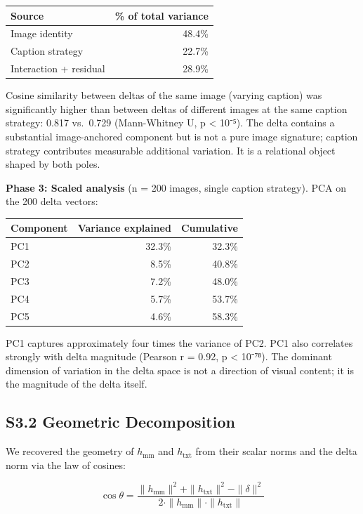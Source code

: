 \documentclass[11pt,a4paper]{article}
\begin{document}
\begin{longtable}[]{@{}lr@{}}
\toprule\noalign{}
Source & \% of total variance \\
\midrule\noalign{}
\endhead
\bottomrule\noalign{}
\endlastfoot
Image identity & 48.4\% \\
Caption strategy & 22.7\% \\
Interaction + residual & 28.9\% \\
\end{longtable}

Cosine similarity between deltas of the same image (varying caption) was significantly higher than between deltas of different images at the same caption strategy: 0.817 vs.~0.729 (Mann-Whitney U, p \textless{} 10⁻⁵). The delta contains a substantial image-anchored component but is not a pure image signature; caption strategy contributes measurable additional variation. It is a relational object shaped by both poles.

\textbf{Phase 3: Scaled analysis} (n = 200 images, single caption strategy). PCA on the 200 delta vectors:

\begin{longtable}[]{@{}lrr@{}}
\toprule\noalign{}
Component & Variance explained & Cumulative \\
\midrule\noalign{}
\endhead
\bottomrule\noalign{}
\endlastfoot
PC1 & 32.3\% & 32.3\% \\
PC2 & 8.5\% & 40.8\% \\
PC3 & 7.2\% & 48.0\% \\
PC4 & 5.7\% & 53.7\% \\
PC5 & 4.6\% & 58.3\% \\
\end{longtable}

PC1 captures approximately four times the variance of PC2. PC1 also correlates strongly with delta magnitude (Pearson r = 0.92, p \textless{} 10⁻⁷⁸). The dominant dimension of variation in the delta space is not a direction of visual content; it is the magnitude of the delta itself.

\subsection*{S3.2 Geometric Decomposition}

We recovered the geometry of \(h_{\text{mm}}\) and \(h_{\text{txt}}\) from their scalar norms and the delta norm via the law of cosines:

\[\cos\theta = \frac{\|h_{\text{mm}}\|^2 + \|h_{\text{txt}}\|^2 - \|\delta\|^2}{2 \cdot \|h_{\text{mm}}\| \cdot \|h_{\text{txt}}\|}\]
\end{document}
